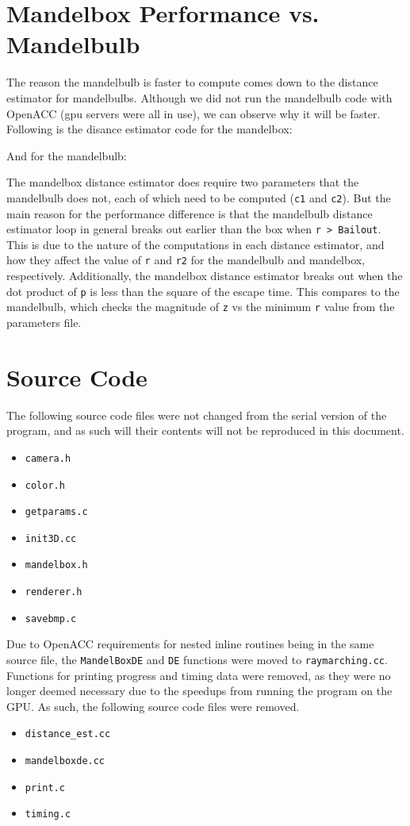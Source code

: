 \documentclass[11pt]{article}
\begin{document}
\section{Mandelbox Performance vs. Mandelbulb}
The reason the mandelbulb is faster to compute comes down to the distance estimator for mandelbulbs. Although we did not run the mandelbulb code with OpenACC (gpu servers were all in use), we can observe why it will be faster. Following is the disance estimator code for the mandelbox:


And for the mandelbulb:


The mandelbox distance estimator does require two parameters that the mandelbulb does not, each of which need to be computed (\texttt{c1} and \texttt{c2}). But the main reason for the performance difference is that the mandelbulb distance estimator loop in general breaks out earlier than the box when \texttt{r > Bailout}. This is due to the nature of the computations in each distance estimator, and how they affect the value of \texttt{r} and \texttt{r2} for the mandelbulb and mandelbox, respectively. Additionally, the mandelbox distance estimator breaks out when the dot product of \texttt{p} is less than the square of the escape time. This compares to the mandelbulb, which checks the magnitude of \texttt{z} vs the minimum \texttt{r} value from the parameters file.

\section{Source Code}
The following source code files were not changed from the serial version of the program, and as such will their contents will not be reproduced in this document.
\begin{itemize}
\item \texttt{camera.h}
\item \texttt{color.h}
\item \texttt{getparams.c}
\item \texttt{init3D.cc}
\item \texttt{mandelbox.h}
\item \texttt{renderer.h}
\item \texttt{savebmp.c}
\end{itemize}

Due to OpenACC requirements for nested inline routines being in the same source file, the \texttt{MandelBoxDE} and \texttt{DE} functions were moved to \texttt{raymarching.cc}. Functions for printing progress and timing data were removed, as they were no longer deemed necessary due to the speedups from running the program on the GPU. As such, the following source code files were removed.
\begin{itemize}
\item \texttt{distance\_est.cc}
\item \texttt{mandelboxde.cc}
\item \texttt{print.c}
\item \texttt{timing.c}
\end{itemize}
\end{document}
